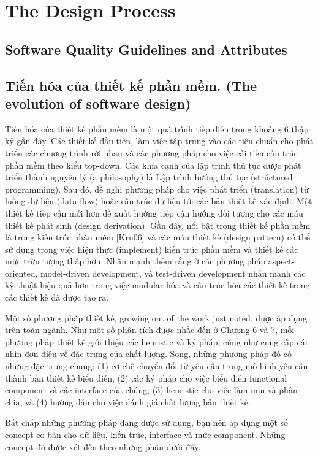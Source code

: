 \documentclass[./../SoftwareEngineering.tex]{subfiles}
\begin{document}
	\section{The Design Process}
	\subsection{Software Quality Guidelines and Attributes}
	\subsection{Tiến hóa của thiết kế phần mềm. (The evolution of software design)}
	Tiến hóa của thiết kế phần mềm là một quá trình tiếp diễn trong khoảng 6 thập kỷ gần đây. Các thiết kế đầu tiên, làm việc tập trung vào các tiêu chuẩn cho phát triển các chương trình rời nhau và các phương pháp cho việc cải tiến cấu trúc phần mềm theo kiểu top-down. Các khía cạnh của lập trình thủ tục được phát triển thành nguyên lý (a philosophy) là Lập trình hướng thủ tục (strúctured programming). Sau đó, đề nghị phương pháp cho việc phát triển (translation) từ luồng dữ liệu (data flow) hoặc cấu trúc dữ liệu tới các bản thiết kế xác định. Một thiết kế tiếp cận mới hơn đề xuất hướng tiếp cận hướng đối tượng cho các mẫu thiết kế phát sinh (design derivation). Gần đây, nổi bật trong thiết kế phần mềm là trong kiến trúc phần mềm [Kru06] và các mẫu thiết kế (design pattern) có thể sử dụng trong việc hiện thực (implement) kiến trúc phần mềm và thiết kế các mức trừu tượng thấp hơn. Nhấn mạnh thêm rằng ở các phương pháp aspect-oriented, model-driven development, và test-driven development nhấn mạnh các kỹ thuật hiệu quả hơn trong việc modular-hóa và cấu trúc hóa các thiết kế trong các thiết kế đã được tạo ra. 
	
	Một số phương pháp thiết kế, growing out of the work just noted, được áp dụng trên toàn ngành. Như một số phân tích được nhắc đến ở Chương 6 và 7, mỗi phương pháp thiết kế giới thiệu các heuristic và ký pháp, cũng như cung cấp cái nhìn đơn điệu về đặc trưng của chất lượng. Song, những phương pháp đó có những đặc trưng chung: (1) cơ chế chuyển đổi từ yêu cầu trong mô hình yêu cầu thành bản thiết kế biểu diễn, (2) các ký pháp cho việc biểu diễn functional component và các interface của chúng, (3) heuristic cho việc làm mịn và phân chia, và (4) hướng dẫn cho việc đánh giá chất lượng bản thiết kế.
	
	Bất chấp những phương pháp đang được sử dụng, bạn nên áp dụng một số concept cơ bản cho dữ liệu, kiến trúc, interface và mức component. Những concept đó được xét đến theo những phần dưới đây.
	
\end{document}
